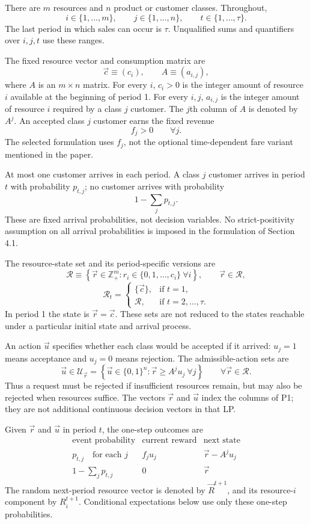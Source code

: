 \documentclass{article}
\begin{document}
There are \(m\) resources and \(n\) product or customer classes. Throughout,
\[
i\in\{1,\ldots,m\},\qquad
j\in\{1,\ldots,n\},\qquad
t\in\{1,\ldots,\tau\}.
\]
The last period in which sales can occur is \(\tau\). Unqualified sums
and quantifiers over \(i,j,t\) use these ranges.

The fixed resource vector and consumption matrix are
\[
\vec c\equiv(c_i),\qquad A\equiv(a_{i,j}),
\]
where \(A\) is an \(m\times n\) matrix. For every \(i\), \(c_i>0\)
is the integer amount of resource \(i\) available at the beginning of
period 1. For every \(i,j\), \(a_{i,j}\) is the integer amount of
resource \(i\) required by a class \(j\) customer. The \(j\)th column
of \(A\) is denoted by \(A^j\). An accepted class \(j\) customer earns
the fixed revenue
\[
f_j>0\qquad\forall j.
\]
The selected formulation uses \(f_j\), not the optional time-dependent
fare variant mentioned in the paper.

At most one customer arrives in each period. A class \(j\) customer
arrives in period \(t\) with probability \(p_{t,j}\); no customer arrives
with probability
\[
1-\sum_j p_{t,j}.
\]
These are fixed arrival probabilities, not decision variables. No
strict-positivity assumption on all arrival probabilities is imposed
in the formulation of Section 4.1.

The resource-state set and its period-specific versions are
\[
\mathscr R\equiv
\left\{\vec r\in\mathbb Z_+^m:
 r_i\in\{0,1,\ldots,c_i\}\ \forall i\right\},
\qquad \vec r\in\mathscr R,
\]
\[
\mathscr R_t=
\begin{cases}
\{\vec c\},&\text{if }t=1,\\
\mathscr R,&\text{if }t=2,\ldots,\tau.
\end{cases}
\]
In period 1 the state is \(\vec r=\vec c\). These sets are not reduced
to the states reachable under a particular initial state and arrival
process.

An action \(\vec u\) specifies whether each class would be accepted
if it arrived: \(u_j=1\) means acceptance and \(u_j=0\) means rejection.
The admissible-action sets are
\[
\vec u\in\mathscr U_{\vec r}
=\left\{\vec u\in\{0,1\}^n:
\vec r\geqslant A^j u_j\ \forall j\right\}
\qquad\forall\vec r\in\mathscr R.
\]
Thus a request must be rejected if insufficient resources remain, but
may also be rejected when resources suffice. The vectors \(\vec r\)
and \(\vec u\) index the columns of P1; they are not additional
continuous decision vectors in that LP.

Given \(\vec r\) and \(\vec u\) in period \(t\), the one-step outcomes are
\[
\begin{array}{c|c|c}
\text{event probability}&\text{current reward}&\text{next state}\\ \hline
p_{t,j}\quad\text{for each }j&f_j u_j&\vec r-A^j u_j\\
1-\sum_jp_{t,j}&0&\vec r
\end{array}
\]
The random next-period resource vector is denoted by \(\vec R^{t+1}\),
and its resource-\(i\) component by \(R_i^{t+1}\). Conditional
expectations below use only these one-step probabilities.
\end{document}
